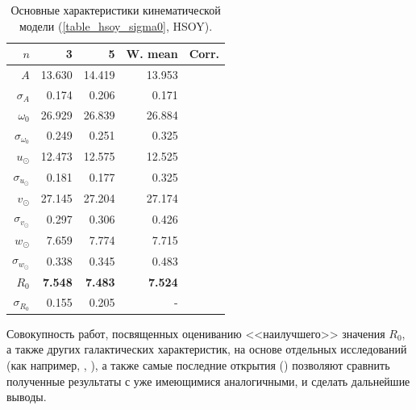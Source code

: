 \documentclass{matmex-diploma-custom}
\begin{document}
\begin{table}[h!!] 
\centering
\caption{Основные характеристики кинематической модели (\ref{table_hsoy_sigma0}, HSOY).}
\begin{tabular}{r|rr|r|r}
        $ n$ & 3 & 5 & W. mean & Corr.\\
\hline
\hline
$A $& 13.630     &    14.419 &  13.953 & \\
$\sigma_{A}$& 0.174     &  0.206 &   0.171  &\\
$\omega_0 $& 26.929     &  26.839 & 26.884  &\\
$\sigma_{\omega_0}$& 0.249     & 0.251 & 0.325  &\\
$u_{\odot} $& 12.473     &  12.575 & 12.525  &\\
$\sigma_{u_{\odot}}$& 0.181     & 0.177 & 0.325  &\\
$v_{\odot} $& 27.145     &  27.204 & 27.174  &\\
$\sigma_{v_{\odot}}$& 0.297     & 0.306 & 0.426  &\\
$w_{\odot} $& 7.659     &  7.774 & 7.715  &\\
$\sigma_{w_{\odot}}$& 0.338     & 0.345 & 0.483  &\\
\hline
$R_0 $& \textbf{7.548}     &  \textbf{7.483} & \textbf{7.524}  &\\
$\sigma_{R_0}$& 0.155 & 0.205 & -  &\\
\end{tabular}
\end{table}
Совокупность работ, посвященных оцениванию <<наилучшего>> значения $R_0$, а также других галактических характеристик, на основе отдельных исследований (как например, \cite{Malkin}, \cite{Camarillo}), а также самые последние открытия (\cite{Gravity}) позволяют сравнить полученные результаты с уже имеющимися аналогичными, и сделать дальнейшие выводы. 
\end{document}
